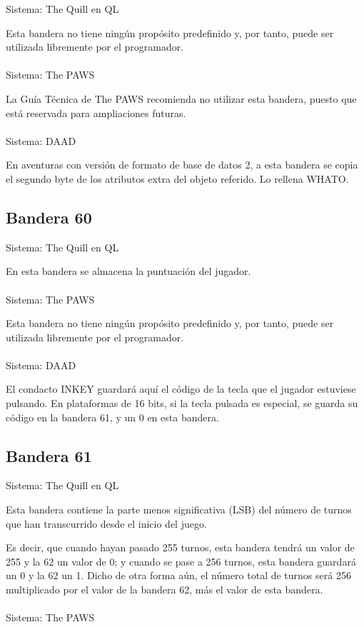 \documentclass[11pt, a5paper]{article}
\newcommand{\quill}{\textsf{The Quill}\xspace}
\newcommand{\paw}{\textsf{The PAWS}\xspace}
\newcommand{\daad}{\textsf{DAAD}\xspace}
\newcommand{\sistema}[1]{\noindent Sistema: #1 \nopagebreak}
\begin{document}
\sistema{\quill en QL}

Esta bandera no tiene ningún propósito predefinido y, por tanto, puede ser utilizada libremente por el programador.
\\\ \\
\sistema{\paw}

La Guía Técnica de \paw \cite{PawsZX} recomienda no utilizar esta bandera, puesto que está reservada para ampliaciones futuras.
\\\ \\
\sistema{\daad}

En aventuras con versión de formato de base de datos 2, a esta bandera se copia el segundo byte de los atributos extra del objeto referido. Lo rellena WHATO.

\subsection{Bandera 60}

\sistema{\quill en QL}

En esta bandera se almacena la puntuación del jugador.
\\\ \\
\sistema{\paw}

Esta bandera no tiene ningún propósito predefinido y, por tanto, puede ser utilizada libremente por el programador.
\\\ \\
\sistema{\daad}

El condacto INKEY guardará aquí el código de la tecla que el jugador estuviese pulsando. En plataformas de 16 bits, si la tecla pulsada es especial, se guarda su código en la bandera 61, y un 0 en esta bandera. \cite[págs. 25, 61 y 62]{DAAD}

\subsection{Bandera 61}

\sistema{\quill en QL}

Esta bandera contiene la parte menos significativa (LSB) del número de turnos que han transcurrido desde el inicio del juego.

Es decir, que cuando hayan pasado 255 turnos, esta bandera tendrá un valor de 255 y la 62 un valor de 0; y cuando se pase a 256 turnos, esta bandera guardará un 0 y la 62 un 1. Dicho de otra forma aún, el número total de turnos será 256 multiplicado por el valor de la bandera 62, más el valor de esta bandera.
\\\ \\
\sistema{\paw}
\end{document}
